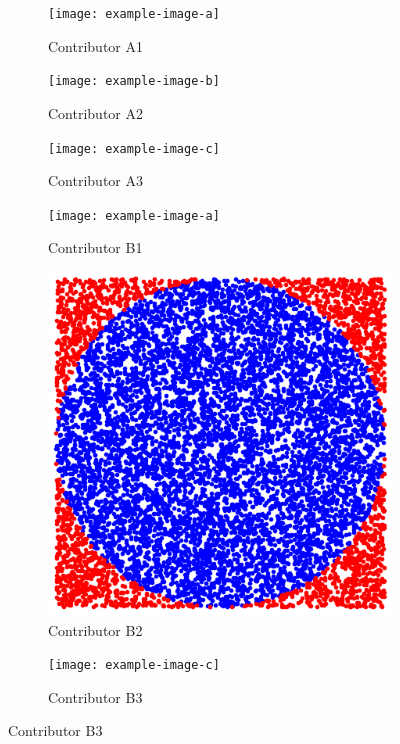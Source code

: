\documentclass{textbook}
\begin{document}
\begin{figure}[H]
  \centering
    \begin{minipage}{0.9\textwidth} %
  \begin{subfigure}{0.3\textwidth}
    \texttt{[image: example-image-a]}
    \caption{Contributor A1}
  \end{subfigure}
  \hfill
  \begin{subfigure}{0.3\textwidth}
    \texttt{[image: example-image-b]}
    \caption{Contributor A2}
  \end{subfigure}
  \hfill
  \begin{subfigure}{0.3\textwidth}
    \texttt{[image: example-image-c]}
    \caption{Contributor A3}
  \end{subfigure}
  
  \vspace{1cm}

  \begin{subfigure}{0.3\textwidth}
    \texttt{[image: example-image-a]}
    \caption{Contributor B1}
  \end{subfigure}
  \hfill
  \begin{subfigure}{0.3\textwidth}
    \includegraphics[width=\textwidth]{resources/textbook_front.png}
    \caption{Contributor B2}
  \end{subfigure}
  \hfill
  \begin{subfigure}{0.3\textwidth}
    \texttt{[image: example-image-c]}
    \caption{Contributor B3}
  \end{subfigure}


\end{minipage}
\end{figure}
\end{document}
